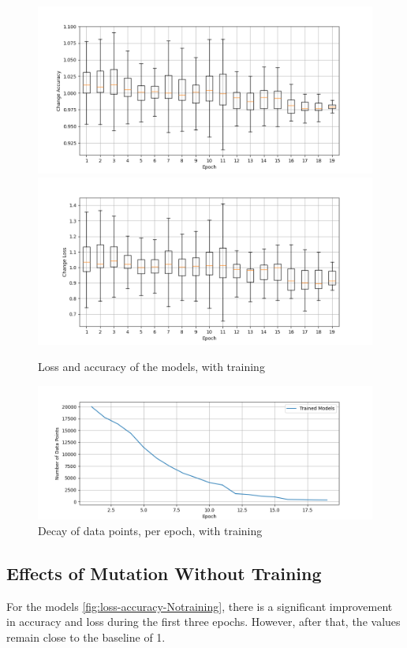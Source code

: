 \begin{figure}
    \centering
    \includegraphics[width=\textwidth]{plots/Trained_Change_Acc.png}
    \includegraphics[width=\textwidth]{plots/Trained_Change_Loss.png}
    \caption{Loss and accuracy of the models, with training}
    \label{fig:loss-accuracy-training}
\end{figure}
\begin{figure}
    \centering
    \includegraphics[width=\textwidth]{plots/Trained_Points_perEpoch.png}
    \caption{Decay of data points, per epoch, with training}
    \label{fig:decay_training}
\end{figure}
\subsection{Effects of Mutation Without Training}\label{subsec:effects-of-mutation-without-training}
For the models \ref{fig:loss-accuracy-Notraining}, there is a significant improvement in accuracy and loss during the first three epochs.
However, after that, the values remain close to the baseline of 1.

